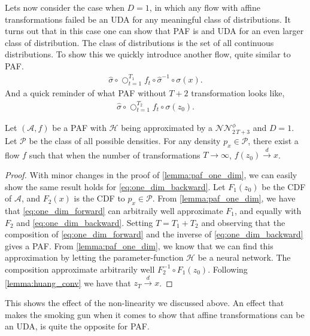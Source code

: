 Lets now consider the case when \(D=1\), in which any flow with affine transformations failed be an UDA
for any meaningful class of distributions. It turns out that in this case one can show that PAF is 
and UDA for an even larger class of distribution. The class of distributions is the set of all
continuous distributions. To show this we quickly introduce another flow, quite similar to PAF.
\begin{align}\label{eq:one_dim_backward}
    \hat{\sigma} \circ \bigcirc_{t=1}^{T_1} f_{t} \circ \hat{\sigma}^{-1} \circ \sigma(x).
\end{align}
And a quick reminder of what PAF without \(T+2\) transformation looks like,
\begin{align}\label{eq:one_dim_forward}
    \hat{\sigma} \circ \bigcirc_{t=1}^{T_2} f_t \circ \sigma(z_0).
\end{align}
\begin{proposition}
    Let \((\mathcal{A}, f)\) be a PAF with \(\mathcal{H}\) being 
    approximated by a \(\mathcal{NN}_{2\,T + 3}^{\phi}\) and \(D=1\). Let \(\mathscr{P}\) be the class
    of all possible densities. For any density \(p_{x} \in \mathscr{P}\), there exist
    a flow \(f\) such that when the number of transformations \(T \rightarrow \infty\), 
    \(f(z_0) \xrightarrow{d} x\).
\end{proposition}
\begin{proof}
    With minor changes in the proof of \cref{lemma:paf_one_dim}, we can easily show the
    same result holds for \cref{eq:one_dim_backward}.
    Let \(F_1(z_0)\) be the CDF of \(\mathcal{A}\), and \(F_2(x)\) is the CDF to \(p_{x} \in \mathscr{P}\).
    From \cref{lemma:paf_one_dim}, we have that \cref{eq:one_dim_forward} can arbitraily well
    approximate \(F_1\), and equally with \(F_2\) and \cref{eq:one_dim_backward}. Setting \(T=T_1 + T_2\)
    and observing that the composition of \cref{eq:one_dim_forward} and the inverse of \cref{eq:one_dim_backward}
    gives a PAF. From \cref{lemma:paf_one_dim}, we know that we can
    find this approximation by letting the parameter-function \(\mathcal{H}\) be a neural network.
    The composition approximate arbitrarily well \(F_2^{-1} \circ F_1(z_0)\). Following \cref{lemma:huang_conv}
    we have that \(z_T \xrightarrow{d} x\). 
\end{proof}
This shows the effect of the non-linearity we discussed above. An effect that makes the smoking
gun when it comes to show that affine transformations can be an UDA, is quite the opposite for PAF.




    

